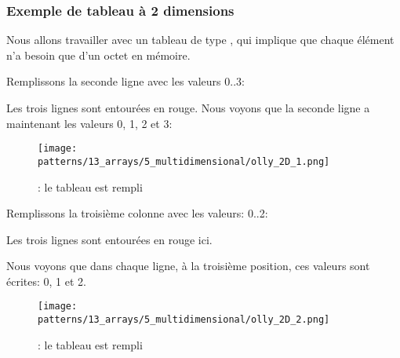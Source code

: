 \subsubsection{Exemple de tableau à 2 dimensions}

Nous allons travailler avec un tableau de type \Tchar, qui implique que chaque élément
n'a besoin que d'un octet en mémoire.

\myindex{\olly}

Remplissons la seconde ligne avec les valeurs 0..3:



Les trois lignes sont entourées en rouge.
Nous voyons que la seconde ligne a maintenant les valeurs 0, 1, 2 et 3:

\begin{figure}[H]
\centering
\texttt{[image: patterns/13\_arrays/5\_multidimensional/olly\_2D\_1.png]}
\caption{\olly: le tableau est rempli}
\end{figure}

\myindex{\olly}

Remplissons la troisième colonne avec les valeurs: 0..2:



Les trois lignes sont entourées en rouge ici.

Nous voyons que dans chaque ligne, à la troisième position, ces valeurs sont écrites:
0, 1 et 2.

\begin{figure}[H]
\centering
\texttt{[image: patterns/13\_arrays/5\_multidimensional/olly\_2D\_2.png]}
\caption{\olly: le tableau est rempli}
\end{figure}

